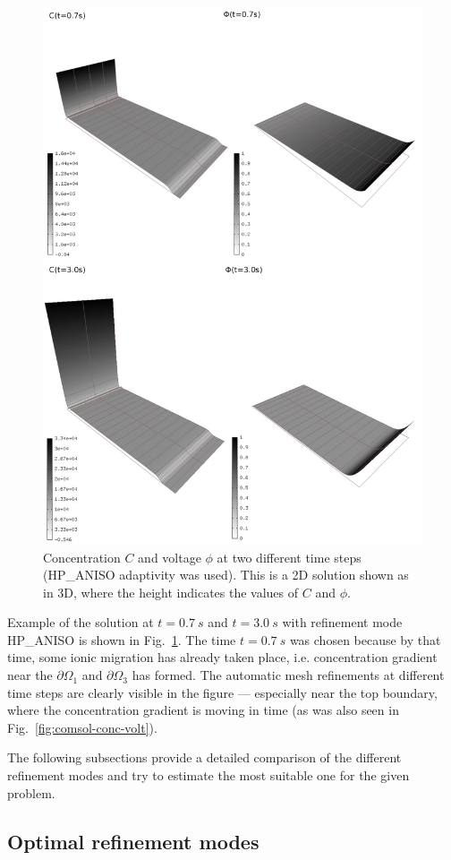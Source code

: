 \begin{figure}[!ht]
  \begin{centering}
  \includegraphics[width=.75\columnwidth]{cphi}
  \caption{\label{fig:cphi} Concentration $C$
  and voltage $\phi$ at two different time steps
  (HP\_ANISO adaptivity was used). This is a 2D solution shown
  as in 3D, where the height indicates the values of $C$ and $\phi$.}
  \end{centering}
\end{figure}
Example of the solution at $t=0.7\ s$ and $t=3.0\ s$ 
with refinement mode HP\_ANISO is shown
in Fig.~\ref{fig:cphi}. The time $t=0.7\ s$ was chosen because
by that time, some ionic migration has already taken place, i.e.
concentration gradient near the $\partial\Omega_1$ and
$\partial\Omega_3$ has formed. The automatic mesh refinements
at different time steps are clearly visible in the figure --- especially
near the top boundary, where the concentration gradient is
moving in time (as was also seen in Fig.~\ref{fig:comsol-conc-volt}).

The following subsections provide a detailed comparison of
the different refinement modes and try to estimate the most suitable
one for the given problem.

\subsection{Optimal refinement modes}

